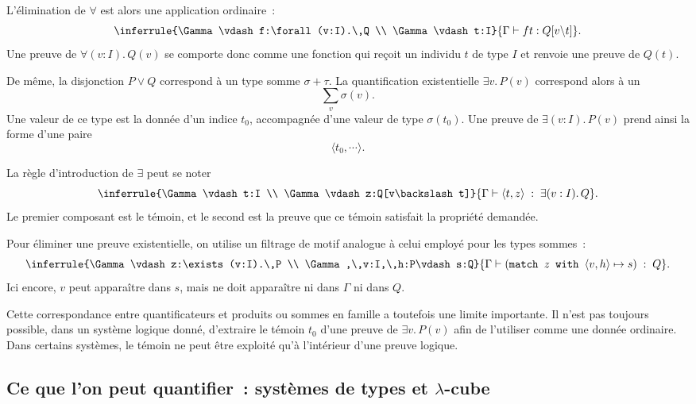 L'élimination de $\forall$ est alors une application ordinaire :
\[
\inferrule
  {\Gamma\vdash f:\forall(v:I).\,Q
   \\
   \Gamma\vdash t:I}
  {\Gamma\vdash ft:Q[v\backslash t]}.
\]
Une preuve de $\forall(v:I).\,Q(v)$ se comporte donc comme une fonction
qui reçoit un individu $t$ de type $I$ et renvoie une preuve de $Q(t)$.

\thingy
De même, la disjonction $P\lor Q$ correspond à un type somme
$\sigma+\tau$.  La quantification existentielle $\exists v.\,P(v)$
correspond alors à un 
\[
\sum_v \sigma(v).
\]
Une valeur de ce type est la donnée d'un indice $t_0$, accompagnée
d'une valeur de type $\sigma(t_0)$.  Une preuve de
$\exists(v:I).\,P(v)$ prend ainsi la forme d'une paire
\[
\langle t_0,\cdots\rangle.
\]

\thingy
La règle d'introduction de $\exists$ peut se noter
\[
\inferrule
  {\Gamma\vdash t:I
   \\
   \Gamma\vdash z:Q[v\backslash t]}
  {\Gamma\vdash\langle t,z\rangle
   \;:\;\exists(v:I).\,Q}.
\]
Le premier composant est le témoin, et le second est la preuve que ce
témoin satisfait la propriété demandée.

Pour éliminer une preuve existentielle, on utilise un filtrage de motif
analogue à celui employé pour les types sommes :
\[
\inferrule
  {\Gamma\vdash z:\exists(v:I).\,P
   \\
   \Gamma,\,v:I,\,h:P\vdash s:Q}
  {\Gamma\vdash
   (\texttt{match~}z\texttt{~with~}\langle v,h\rangle\mapsto s)
   \;:\;Q}.
\]
Ici encore, $v$ peut apparaître dans $s$, mais ne doit apparaître ni
dans $\Gamma$ ni dans $Q$.

\thingy
Cette correspondance entre quantificateurs et produits ou sommes en
famille a toutefois une limite importante.  Il n'est pas toujours
possible, dans un système logique donné, d'extraire le témoin $t_0$
d'une preuve de $\exists v.\,P(v)$ afin de l'utiliser comme une donnée
ordinaire.  Dans certains systèmes, le témoin ne peut être exploité
qu'à l'intérieur d'une preuve logique.


\subsection{Ce que l'on peut quantifier : systèmes de types et
$\lambda$-cube}

